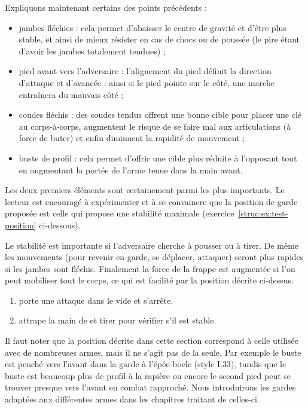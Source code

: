 \noindent
Expliquons maintenant certains des points précédents :
\begin{itemize}
	\item jambes fléchies : cela permet d'abaisser le centre de gravité et d'être plus stable, et ainsi de mieux résister en cas de chocs ou de poussée (le pire étant d'avoir les jambes totalement tendues) ;
	
	\item pied avant vers l'adversaire : l'alignement du pied définit la direction d'attaque et d'avancée : ainsi si le pied pointe sur le côté, une marche entraînera du mauvais côté ;
	
	\item coudes fléchis : des coudes tendus offrent une bonne cible pour placer une clé au corps-à-corps, augmentent le risque de se faire mal aux articulations (à force de buter) et enfin diminuent la rapidité de mouvement ;
	
	\item buste de profil : cela permet d'offrir une cible plus réduite à l'opposant tout en augmentant la portée de l'arme tenue dans la main avant.
\end{itemize}
Les deux premiers éléments sont certainement parmi les plus importants.
Le lecteur est encouragé à expérimenter et à se convaincre que la position de garde proposée est celle qui propose une stabilité maximale (exercice~\ref{struc:ex:test-position} ci-dessous).

Le stabilité est importante si l'adversaire cherche à pousser ou à tirer.
De même les mouvements (pour revenir en garde, se déplacer, attaquer) seront plus rapides si les jambes sont fléchis.
Finalement la force de la frappe est augmentée si l'on peut mobiliser tout le corps, ce qui est facilité par la position décrite ci-dessus.

\begin{exercice}

\begin{enumerate}
	\item \A porte une attaque dans le vide et s'arrête.
	
	\item \D attrape la main de \A et tirer pour vérifier s'il est stable.
\end{enumerate}
\end{exercice}

Il faut noter que la position décrite dans cette section correspond à celle utilisée avec de nombreuses armes, mais il ne s'agit pas de la seule.
Par exemple le buste est penché vers l'avant dans la garde à l'épée-bocle (style I.33), tandis que le buste est beaucoup plus de profil à la rapière ou encore le second pied peut se trouver presque vers l'avant en combat rapproché.
Nous introduirons les gardes adaptées aux différentes armes dans les chapitres traitant de celles-ci.

